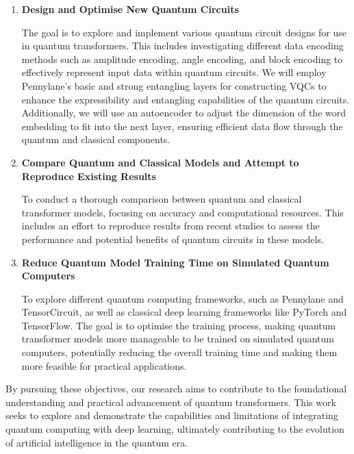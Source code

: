 \begin{enumerate}
  \item  \textbf{Design and Optimise New Quantum Circuits}

    The goal is to explore and implement various quantum circuit
    designs for use in quantum transformers. This includes
    investigating different data encoding methods such as amplitude
    encoding, angle encoding, and block encoding to effectively
    represent input data within quantum circuits. We will employ
    Pennylane's basic and strong entangling layers for constructing
    \glspl{VQC} to enhance the expressibility
    and entangling capabilities of the quantum circuits.
    Additionally, we will use an autoencoder to adjust the dimension
    of the word embedding to fit into the next layer, ensuring
    efficient data flow through the quantum and classical components.

  \item  \textbf{Compare Quantum and Classical Models and Attempt to
    Reproduce Existing Results}

    To conduct a thorough comparison between quantum and classical
    transformer models, focusing on accuracy and computational
    resources. This includes an effort to reproduce results from
    recent studies to assess the performance and potential benefits
    of quantum circuits in these models.

  \item  \textbf{Reduce Quantum Model Training Time on Simulated
    Quantum Computers}

    To explore different quantum computing frameworks, such as
    Pennylane and TensorCircuit, as well as classical deep learning
    frameworks like PyTorch and TensorFlow. The goal is to optimise
    the training process, making quantum transformer models more
    manageable to be trained on simulated quantum computers,
    potentially reducing the overall training time and making them
    more feasible for practical applications.

\end{enumerate}

By pursuing these objectives, our research aims to contribute to the
foundational understanding and practical advancement of quantum
transformers. This work seeks to explore and demonstrate the
capabilities and limitations of integrating quantum computing with
deep learning, ultimately contributing to the evolution of artificial
intelligence in the quantum era.

